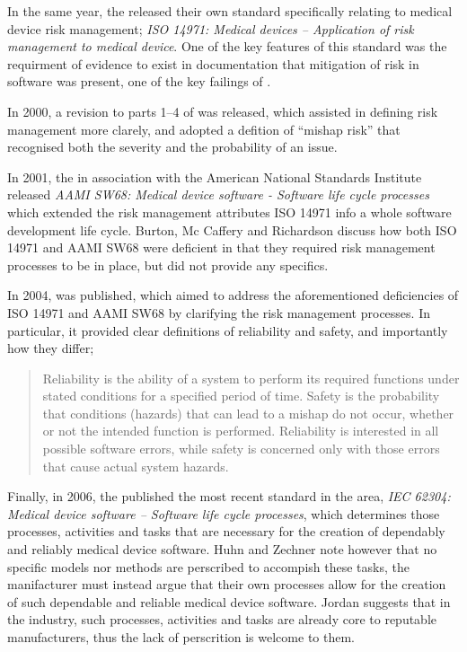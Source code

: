 \documentclass{cshonours}
\begin{document}
{In the same year, the \iso released their own standard specifically relating to medical device risk management; \textit{ISO 14971: Medical devices -- Application of risk management to medical device}. One of the key features of this standard was the requirment of evidence to exist in documentation that mitigation of risk in software was present, one of the key failings of \aecl. \cite{rakitin2006coping}

In 2000, a revision to parts 1--4 of  was released, which assisted in defining risk management more clarely, and adopted a defition of ``mishap risk'' that recognised both the severity and the probability of an issue. \cite{rakitin2006coping}

In 2001, the \aami in association with the American National Standards Institute released \textit{AAMI SW68: Medical device software - Software life cycle processes} which extended the risk management attributes ISO 14971 info a whole software development life cycle. \cite{rakitin2006coping} Burton, Mc Caffery and Richardson discuss how both ISO 14971 and AAMI SW68 were deficient in that they required risk management processes to be in place, but did not provide any specifics. \cite{burton2006risk}

In 2004,  was published, which aimed to address the aforementioned deficiencies of ISO 14971 and AAMI SW68 by clarifying the risk management processes. \cite{rakitin2006coping} In particular, it provided clear definitions of reliability and safety, and importantly how they differ;
\begin{quote}
Reliability is the ability of a system to perform its required functions under stated conditions for a specified period of time. Safety is the probability that conditions (hazards) that can lead to a mishap do not occur, whether or not the intended function is performed. Reliability is interested in all possible software errors, while safety is concerned only with those errors that cause actual system hazards. \cite{aamitir32}
\end{quote}

Finally, in 2006, the \iec published the most recent standard in the area, \textit{IEC 62304: Medical device software -- Software life cycle processes}, which determines those processes, activities and tasks that are necessary for the creation of dependably and reliably medical device software. Huhn and Zechner note however that no specific models nor methods are perscribed to accompish these tasks, the manifacturer must instead argue that their own processes allow for the creation of such dependable and reliable medical device software. \cite{huhn2010arguing} Jordan suggests that in the industry, such processes, activities and tasks are already core to reputable manufacturers, thus the lack of perscrition is welcome to them. \cite{jordan2006standard}


}
\end{document}
